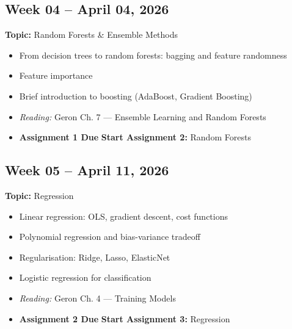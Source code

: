 \documentclass[
  10pt,
]{article}
\providecommand{\tightlist}{%
  \setlength{\itemsep}{0pt}\setlength{\parskip}{0pt}}
\newenvironment{blackbox}{%
  \def\FrameCommand{%
    \hspace{1pt}%
    {\color{boxborder}\vrule width 2pt}%
    {\color{boxbg}\vrule width 4pt}%
    \colorbox{boxbg}%
  }%
  \MakeFramed{\advance\hsize-\width\FrameRestore}%
  \noindent\ignorespaces
}{%
  \endMakeFramed
}
\begin{document}
\begin{blackbox}

\begin{center}

\subsection{Week 04 -- April 04, 2026}\label{week-04-april-04-2026}

\end{center}

\textbf{Topic:} Random Forests \& Ensemble Methods

\begin{itemize}
\tightlist
\item
  From decision trees to random forests: bagging and feature randomness
\item
  Feature importance
\item
  Brief introduction to boosting (AdaBoost, Gradient Boosting)
\item
  \emph{Reading:} Geron Ch. 7 --- Ensemble Learning and Random Forests
\item
  \textbf{Assignment 1 Due} \textbar{} \textbf{Start Assignment 2:}
  Random Forests
\end{itemize}

\end{blackbox}

\begin{blackbox}

\begin{center}

\subsection{Week 05 -- April 11, 2026}\label{week-05-april-11-2026}

\end{center}

\textbf{Topic:} Regression

\begin{itemize}
\tightlist
\item
  Linear regression: OLS, gradient descent, cost functions
\item
  Polynomial regression and bias-variance tradeoff
\item
  Regularisation: Ridge, Lasso, ElasticNet
\item
  Logistic regression for classification
\item
  \emph{Reading:} Geron Ch. 4 --- Training Models
\item
  \textbf{Assignment 2 Due} \textbar{} \textbf{Start Assignment 3:}
  Regression
\end{itemize}

\end{blackbox}
\end{document}
